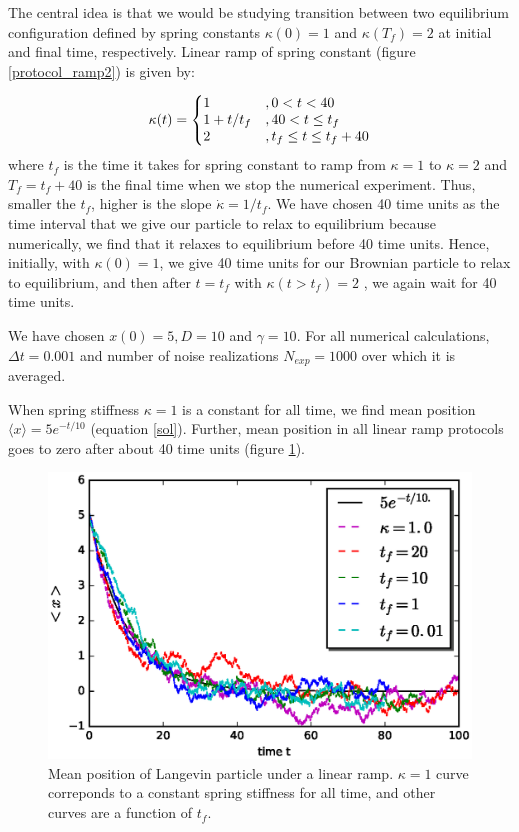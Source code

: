 \documentclass[11pt,a4paper]{article}
\begin{document}
The central idea is that we would be studying transition between two equilibrium configuration defined by spring constants $\kappa(0)=1$ and $\kappa(T_f)=2$ at initial and final time, respectively. Linear ramp of spring constant (figure \ref{protocol_ramp2}) is given by:



\begin{equation}
  \kappa(t)=\left\{
  \begin{array}{@{}ll@{}}
    1 & ,0< t <40 \\
    1+ t/t_f & ,  40 < t \leq t_f \\
    2 & , t_f \leq t \leq  t_f+ 40 \\
  \end{array}\right.
\end{equation}
where $t_f$ is the time it takes for spring constant to ramp from $\kappa=1$ to $\kappa=2$ and $T_f=t_f+40$ is the final time when we stop the numerical experiment. Thus, smaller the $t_f$, higher is the slope $ \dot{\kappa}=1/t_f$.  We have chosen 40 time units as the time interval that we give our particle to relax to equilibrium because numerically, we find that it relaxes to equilibrium before 40 time units. Hence, initially, with $\kappa(0)=1$, we give 40 time units for our Brownian particle to relax to equilibrium, and then after $t=t_f$ with $\kappa(t>t_f)=2$ , we again wait for 40 time units.

We have chosen $x(0)=5, D=10$ and $\gamma=10$. For all numerical calculations, $\Delta t=0.001$ and number of noise realizations $N_{exp}=1000$ over which it is averaged. 

When spring stiffness $\kappa =1$ is a constant for all time, we find mean position  $\langle x \rangle=5 e^{-t/10}$ (equation \ref{sol}). Further, mean position in all linear ramp protocols goes to zero after about 40 time units (figure \ref{ramp_mean2}).

\begin{figure}[!htbp]
\centering
\includegraphics[scale=0.67]{ramp_mean2.eps}
\caption{ Mean position of Langevin particle under a linear ramp. $\kappa=1$ curve correponds to a constant spring stiffness for all time, and other curves are a function of $t_f$. }
\label{ramp_mean2}
\end{figure}
\end{document}

